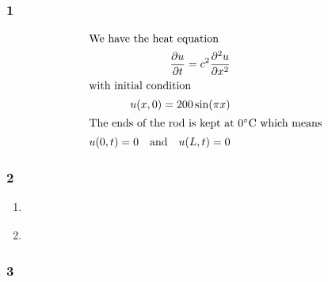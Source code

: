 \documentclass[a4paper]{article}
\newcommand{\ex}[1]{\subsubsection*{#1}}
\begin{document}
\pagestyle{fancy} %



\ex{1}

\begin{align}
    \intertext{We have the heat equation}
    \frac{\partial u}{\partial t} = c^2 \frac{\partial^2 u}{\partial x^2}
        \label{eq:1-def} \\
    \intertext{with initial condition}
    u(x,0) = 200 \sin(\pi x) \label{eq:1-init} \\
    \intertext{The ends of the rod is kept at 0\degree C which means}
    u(0,t) = 0 \quad\text{and}\quad u(L,t) = 0 \\
\end{align}


\ex{2}

\begin{enumerate}[label=\alph*)]
    \item{
    }

    \item{
    }
\end{enumerate}


\ex{3}

%
\end{document}
